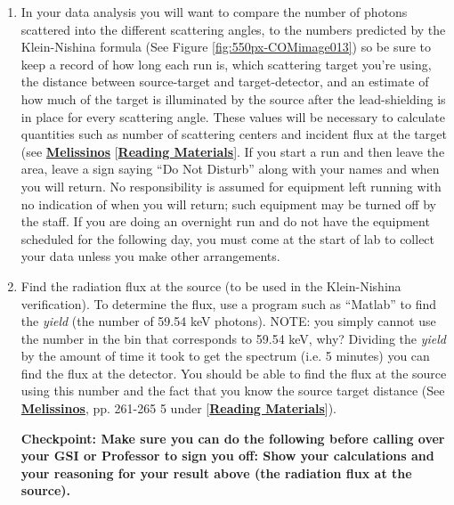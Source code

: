 \documentclass{../lab}
\begin{document}
\begin{enumerate}
\begin{itemize}
    \end{itemize}

    \item In your data analysis you will want to compare the number of photons scattered into the different scattering angles, to the numbers predicted by the Klein-Nishina formula (See Figure \ref{fig:550px-COMimage013}) so be sure to keep a record of how long each run is, which scattering target you're using, the distance between source-target and target-detector, and an estimate of how much of the target is illuminated by the source after the lead-shielding is in place for every scattering angle. These values will be necessary to calculate quantities such as number of scattering centers and incident flux at the target (see \href{http://physics111.lib.berkeley.edu/Physics111/Reprints/COM/Melissinos\%201966\%20pg\%20252-265\%20and\%20369-384.pdf}{\textbf{Melissinos}} [\href{http://physics111.lib.berkeley.edu/Physics111/Reprints/COM/COM\_index.html}{\textbf{Reading Materials}}]. If you start a run and then leave the area, leave a sign saying ``Do Not Disturb'' along with your names and when you will return. No responsibility is assumed for equipment left running with no indication of when you will return; such equipment may be turned off by the staff. If you are doing an overnight run and do not have the equipment scheduled for the following day, you must come at the start of lab to collect your data unless you make other arrangements.

    \item Find the radiation flux at the source (to be used in the Klein-Nishina verification). To determine the flux, use a program such as ``Matlab'' to find the \emph{yield} (the number of 59.54 keV photons). NOTE: you simply cannot use the number in the bin that corresponds to 59.54 keV, why? Dividing the \emph{yield} by the amount of time it took to get the spectrum (i.e. 5 minutes) you can find the flux at the detector. You should be able to find the flux at the source using this number and the fact that you know the source target distance (See \href{http://physics111.lib.berkeley.edu/Physics111/Reprints/COM/Melissinos\%201966\%20pg\%20252-265\%20and\%20369-384.pdf}{\textbf{Melissinos}}, pp. 261-265 5 under [\href{http://physics111.lib.berkeley.edu/Physics111/Reprints/COM/COM\_index.html}{\textbf{Reading Materials}}]). 
    
    \textbf{Checkpoint: Make sure you can do the following before calling over your GSI or Professor to sign you off:
	Show your calculations and your reasoning for your result above (the radiation flux at the source).}


\end{enumerate}
\end{document}
